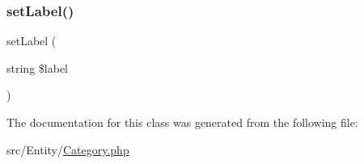 \subsubsection{\texorpdfstring{set\+Label()}{setLabel()}}
{\footnotesize\ttfamily set\+Label (\begin{DoxyParamCaption}\item[{string}]{\$label }\end{DoxyParamCaption})}



The documentation for this class was generated from the following file\+:\begin{DoxyCompactItemize}
\item 
src/\+Entity/\mbox{\hyperlink{_category_8php}{Category.\+php}}\end{DoxyCompactItemize}
